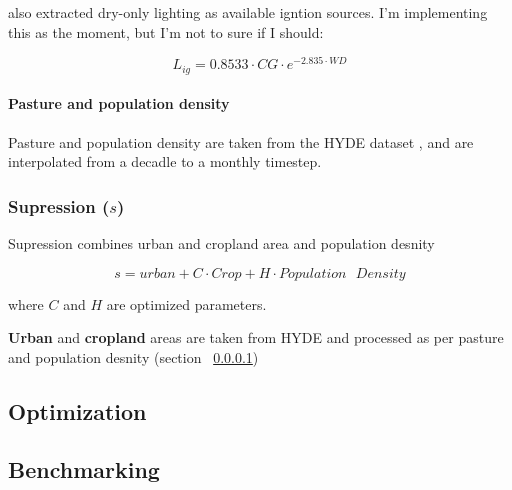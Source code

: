 \citet{kelley2014improved} also extracted dry-only lighting as available igntion sources. I'm implementing this as the moment, but I'm not to sure if I should:

\begin{equation}
    L_{ig} = 0.8533 \cdot CG \cdot e^{-2.835 \cdot WD}
\end{equation}


\paragraph{Pasture and population density}
\label{Pasture}
Pasture and population density are taken from the HYDE dataset \citep{klein2007mapping}, and are interpolated from a decadle to a monthly timestep.

\subsubsection{Supression ($s$)}

Supression combines urban and cropland area and population desnity

\begin{equation}
    s = urban + C \cdot Crop + H \cdot Population\text{ }Density
\end{equation}

where $C$ and $H$ are optimized parameters.

\textbf{Urban} and \textbf{cropland} areas are taken from HYDE and processed as per pasture and population desnity (section ~\ref{Pasture})


\subsection{Optimization}

\subsection{Benchmarking}


